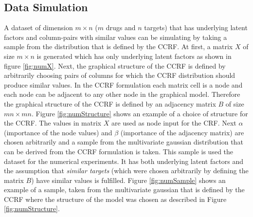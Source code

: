 \subsection{Data Simulation}

A dataset of dimension $m \times n$ ($m$ drugs and $n$ targets) that has underlying latent factors and column-pairs with similar values can be simulating by taking a sample from the distribution that is defined by the CCRF. At first, a matrix $X$ of size $m \times n$ is generated which has only underlying latent factors as shown in figure \ref{fig:numX}. Next, the graphical structure of the CCRF is defined by arbitrarily choosing pairs of columns for which the CCRF distribution should produce similar values. In the CCRF formulation each matrix cell is a node and each node can be adjacent to any other node in the graphical model. Therefore the graphical structure of the CCRF is defined by an adjacency matrix $B$ of size $mn \times mn$. Figure \ref{fig:numStructure} shows an example of a choice of structure for the CCRF.  The values in matrix $X$ are used as node input for the CRF. Next $\alpha$ (importance of the node values) and $\beta$ (importance of the adjacency matrix) are chosen arbitrarily and a sample from the multivariate gaussian distribution that can be derived from the CCRF formulation is taken. This sample is used the dataset for the numerical experiments. It has both underlying latent factors and the assumption that \textit{similar targets} (which were chosen arbitrarily by defining the matrix $B$) have similar values is fulfilled. Figure \ref{fig:numSample} shows an example of a sample, taken from the multivariate gaussian that is defined by the CCRF where the structure of the model was chosen as described in Figure \ref{fig:numStructure}.

